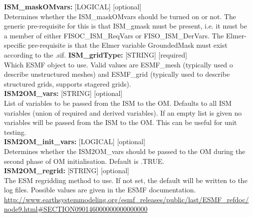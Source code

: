 \documentclass[12pt]{article}
\begin{document}
\begin{flushleft}
\textbf{ISM\_maskOMvars:} [LOGICAL] [optional]                             \\
Determines whether the ISM\_maskOMvars should be turned on or not. The generic
pre-requisite for this is that ISM\_gmask must be present, i.e. it must be a 
member of either FISOC\_ISM\_ReqVars or FISO\C_ISM\_DerVars.
The Elmer-specific pre-requisite is that the Elmer variable GroundedMask must
exist according to the .sif.
\vspace{6pt}
\textbf{ISM\_gridType:}        [STRING] [required]                          \\
Which ESMF object to use.  Valid values are ESMF\_mesh (typically used 
o describe unstructured meshes) and ESMF\_grid (typically used to 
describe structured grids, supports stagered grids).                       \\
\vspace{6pt}
\textbf{ISM2OM\_vars:}        [STRING] [optional]                          \\
List of variables to be passed from the ISM to the OM. Defaults to 
all ISM variables (union of required and derived variables). If an empty 
list is given no variables will be passed from the ISM to the OM.  This 
can be useful for unit testing.                                            \\ 
\vspace{6pt}
\textbf{ISM2OM\_init\_vars:}  [LOGICAL] [optional]                         \\
Determines whether the ISM2OM\_vars should be passed to the OM during the 
second phase of OM initialisation.   Default is .TRUE.                     \\ 
\vspace{6pt}
\textbf{ISM2OM\_regrid:}       [STRING] [optional]                         \\
The ESM regridding method to use.  If not set, the default will be 
written to the log files.  Possible values are given in the ESMF 
documentation. 
\url{http://www.earthsystemmodeling.org/esmf_releases/public/last/ESMF_refdoc/node9.html#SECTION090146000000000000000}

\vspace{22pt}


\end{flushleft}
\end{document}

